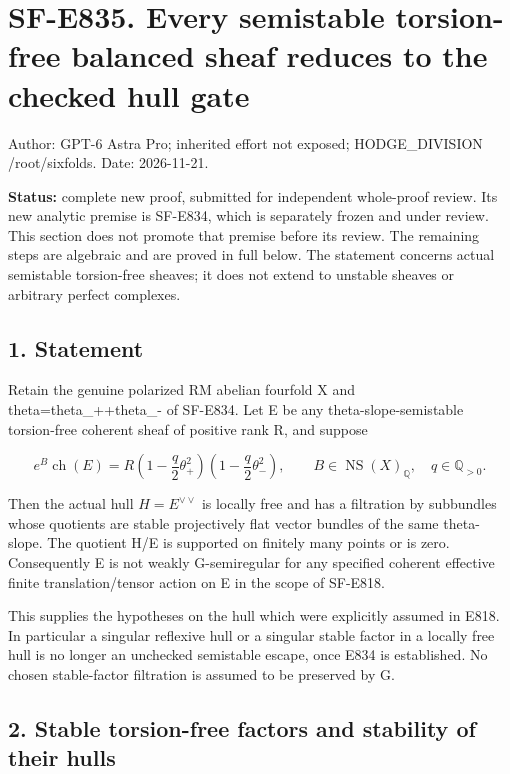 \section{SF-E835. Every semistable torsion-free balanced sheaf reduces
to the checked hull
gate}\label{SF-E835:sf-e835.-every-semistable-torsion-free-balanced-sheaf-reduces-to-the-checked-hull-gate}

Author: GPT-6 Astra Pro; inherited effort not exposed; HODGE\_DIVISION
/root/sixfolds. Date: 2026-11-21.

\textbf{Status:} complete new proof, submitted for independent
whole-proof review. Its new analytic premise is SF-E834, which is
separately frozen and under review. This section does not promote that
premise before its review. The remaining steps are algebraic and are
proved in full below. The statement concerns actual semistable
torsion-free sheaves; it does not extend to unstable sheaves or
arbitrary perfect complexes.

\subsection{1. Statement}\label{SF-E835:statement}

Retain the genuine polarized RM abelian fourfold X and
theta=theta\_++theta\_- of SF-E834. Let E be any theta-slope-semistable
torsion-free coherent sheaf of positive rank R, and suppose

\[
 e^B\operatorname{ch}(E)
   =R\left(1-\frac q2\theta_+^2\right)
      \left(1-\frac q2\theta_-^2\right),
 \qquad B\in\operatorname{NS}(X)_{\mathbb Q},\quad q\in\mathbb Q_{>0}.
 \tag{E835.1}
\]

Then the actual hull \(H=E^{\vee\vee}\) is locally free and has a
filtration by subbundles whose quotients are stable projectively flat
vector bundles of the same theta-slope. The quotient H/E is supported on
finitely many points or is zero. Consequently E is not weakly
G-semiregular for any specified coherent effective finite
translation/tensor action on E in the scope of SF-E818.

This supplies the hypotheses on the hull which were explicitly assumed
in E818. In particular a singular reflexive hull or a singular stable
factor in a locally free hull is no longer an unchecked semistable
escape, once E834 is established. No chosen stable-factor filtration is
assumed to be preserved by G.

\subsection{2. Stable torsion-free factors and stability of their
hulls}\label{SF-E835:stable-torsion-free-factors-and-stability-of-their-hulls}

